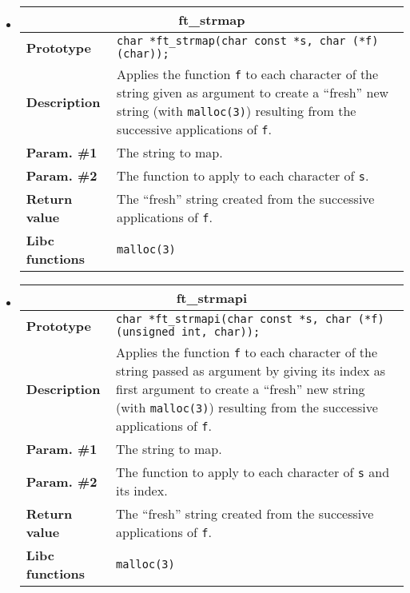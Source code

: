 \documentclass{42-en}
\begin{document}
\begin{itemize}
            \item \begin{tabular}{|l|p{11cm}|}
                \hline
                \multicolumn{2}{|c|}{\textbf{ft\_strmap}}\\
                \hline
                \textbf{Prototype} &
                \texttt{char *\hspace{5mm}ft\_strmap(char const *s, char
                  (*f)(char));}\\
                \hline
                \textbf{Description} & Applies the function \texttt{f}
                to each character of the string given as
                argument to create a ``fresh'' new string (with \texttt{malloc(3)})
                resulting from the successive applications of \texttt{f}.\\
                \hline
                \textbf{Param. \#1} & The string to map.\\
                \hline
                \textbf{Param. \#2} & The function to apply
                to each character of \texttt{s}.\\
                \hline
                \textbf{Return value} & The ``fresh'' string created
                from the successive applications of \texttt{f}.\\
                \hline
                \textbf{Libc functions} & \texttt{malloc(3)}\\
                \hline
            \end{tabular}

            \item \begin{tabular}{|l|p{11cm}|}
                \hline
                \multicolumn{2}{|c|}{\textbf{ft\_strmapi}}\\
                \hline
                \textbf{Prototype} &
                \texttt{char *\hspace{5mm}ft\_strmapi(char const *s, char
                  (*f)(unsigned int, char));}\\
                \hline
                \textbf{Description} & Applies the function \texttt{f}
                to each character of the string passed as
                argument by giving its index as first argument
                to create a ``fresh'' new string (with \texttt{malloc(3)})
                resulting from the successive applications of \texttt{f}.\\
                \hline
                \textbf{Param. \#1} & The string to map.\\
                \hline
                \textbf{Param. \#2} & The function to apply
                to each character of \texttt{s} and its index.\\
                \hline
                \textbf{Return value} & The ``fresh'' string created
                from the successive applications of \texttt{f}.\\
                \hline
                \textbf{Libc functions} & \texttt{malloc(3)}\\
                \hline
            \end{tabular}


\end{itemize}
\end{document}
